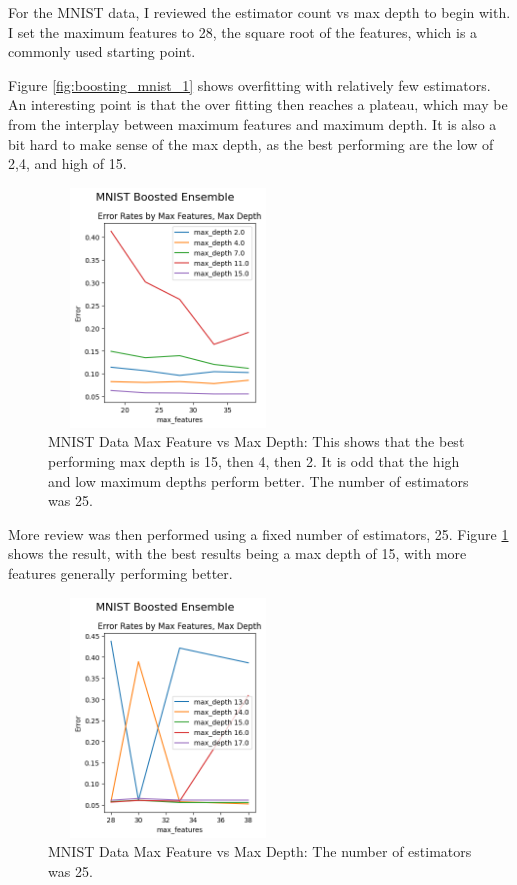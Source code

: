 \documentclass[letterpaper]{article} %
\begin{document}
For the MNIST data, I reviewed the estimator count vs max depth to begin with.  I set the maximum features to 28, the square root of the features, which is a commonly used starting point.

Figure \ref{fig:boosting_mnist_1}  shows overfitting with relatively few estimators.  An interesting point is that the over fitting then reaches a plateau, which may be from the interplay between maximum features and maximum depth.  It is also a bit hard to make sense of the max depth, as the best performing are the low of 2,4, and high of 15. 

\begin{figure}[htb]
\centering
\includegraphics[width=2.5in, height=2.5in]{figures/MNIST_Boosted_Ensemble_boosting_2.png}
\caption{MNIST Data Max Feature vs Max Depth:  This shows that the best performing max depth is 15, then 4, then 2.  It is odd that the high and low maximum depths perform better. The number of estimators was 25.  }
\label{fig:boosting_mnist_2}
\end{figure}

More review was then performed using a fixed number of estimators, 25. Figure \ref{fig:boosting_mnist_2} shows the result, with the best results being a max depth of 15, with more features generally performing better.

\begin{figure}[htb]
\centering
\includegraphics[width=2.5in, height=2.5in]{figures/MNIST_Boosted_Ensemble_boosting_3.png}
\caption{MNIST Data Max Feature vs Max Depth:  The number of estimators was 25.  }
\label{fig:boosting_mnist_3}
\end{figure}
\end{document}
